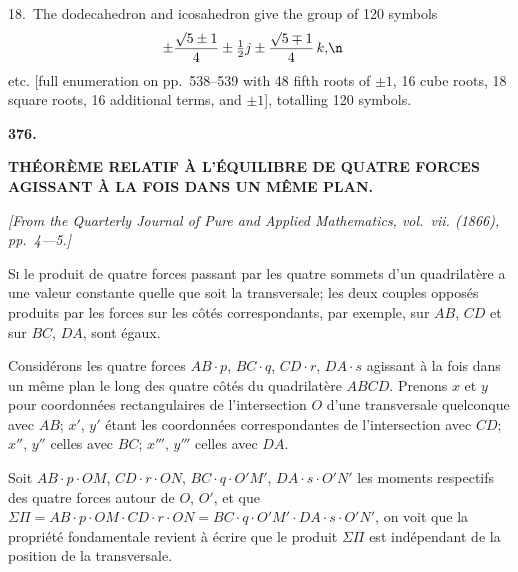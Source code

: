 \documentclass[11pt,a4paper]{article}
\begin{document}
18.~The dodecahedron and icosahedron give the group of 120 symbols
\begin{align*}
\pm \frac{\surd 5 \pm 1}{4} \pm \tfrac{1}{2}j \pm \frac{\surd 5 \mp 1}{4}\,k, &\n\end{align*}
etc. [full enumeration on pp.~538--539 with 48 fifth roots of $\pm 1$, 16 cube roots, 18 square roots, 16 additional terms, and $\pm 1$], totalling 120 symbols.

\vspace{24pt}



\newpage
\begin{center}
\textbf{376.}
\end{center}
\vspace{-8pt}

\begin{center}
\textbf{TH\'{E}OR\`{E}ME RELATIF \`{A} L'\'{E}QUILIBRE DE QUATRE FORCES}
\\[4pt]
\textbf{AGISSANT \`{A} LA FOIS DANS UN M\^{E}ME PLAN.}
\end{center}

\begin{flushright}
\small\textit{[From the Quarterly Journal of Pure and Applied Mathematics, vol.~vii. (1866), pp.~4---5.]}
\end{flushright}

\vspace{6pt}

\noindent
\textsc{Si} le produit de quatre forces passant par les quatre sommets d'un quadrilat\`{e}re a une valeur constante quelle que soit la transversale; les deux couples oppos\'{e}s produits par les forces sur les c\^{o}t\'{e}s correspondants, par exemple, sur $AB$, $CD$ et sur $BC$, $DA$, sont \'{e}gaux.

Consid\'{e}rons les quatre forces $AB \cdot p$, $BC \cdot q$, $CD \cdot r$, $DA \cdot s$ agissant \`{a} la fois dans un m\^{e}me plan le long des quatre c\^{o}t\'{e}s du quadrilat\`{e}re $ABCD$. Prenons $x$ et $y$ pour coordonn\'{e}es rectangulaires de l'intersection $O$ d'une transversale quelconque avec $AB$; $x'$, $y'$ \'{e}tant les coordonn\'{e}es correspondantes de l'intersection avec $CD$; $x''$, $y''$ celles avec $BC$; $x'''$, $y'''$ celles avec $DA$.

Soit $AB \cdot p \cdot OM$, $CD \cdot r \cdot ON$, $BC \cdot q \cdot O'M'$, $DA \cdot s \cdot O'N'$ les moments respectifs des quatre forces autour de $O$, $O'$, et que $\Sigma\Pi = AB \cdot p \cdot OM \cdot CD \cdot r \cdot ON = BC \cdot q \cdot O'M' \cdot DA \cdot s \cdot O'N'$, on voit que la propri\'{e}t\'{e} fondamentale revient \`{a} \'{e}crire que le produit $\Sigma\Pi$ est ind\'{e}pendant de la position de la transversale.
\end{document}
